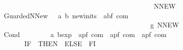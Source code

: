 \begin{isabellebody}
\ \ \ \ \ \ \ \ \ \ \ \ \ \ \ \ \ \ \ \ \ \ \ \ \ \ \ \ \ \ \ \ \ \ \ \ \ \ \ \ \ \ \ \ {\isacharparenleft}{\isachardoublequoteopen}{\isacharparenleft}{\isacharunderscore}\ {\isacharcolon}{\isacharequal}{\isacharequal}{\isacharslash}{\isacharparenleft}{}\ NNEW\ {\isacharunderscore}{\isacharslash}\ {\isacharbrackleft}{\isacharunderscore}{\isacharbrackright}{\isacharparenright}{\isacharparenright}{\isachardoublequoteclose}\ {\isacharbrackleft}{}{}{\isacharcomma}\ {}{}{\isacharcomma}\ {}{\isacharbrackright}\ {}{}{\isacharparenright}\isanewline
\ \ {\isachardoublequoteopen}{\isacharunderscore}GuardedNNew{\isachardoublequoteclose}\ \ {\isacharcolon}{\isacharcolon}\ {\isachardoublequoteopen}{\isacharbrackleft}{\isacharprime}a{\isacharcomma}\ {\isacharprime}b{\isacharcomma}\ newinits{\isacharbrackright}\ {\isasymRightarrow}\ {\isacharparenleft}{\isacharprime}a{\isacharcomma}{\isacharprime}b{\isacharcomma}{\isacharprime}f{\isacharparenright}\ com{\isachardoublequoteclose}\ \isanewline
\ \ \ \ \ \ \ \ \ \ \ \ \ \ \ \ \ \ \ \ \ \ \ \ \ \ \ \ \ \ \ \ \ \ \ \ \ \ \ \ \ \ \ \ {\isacharparenleft}{\isachardoublequoteopen}{\isacharparenleft}{\isacharunderscore}\ {\isacharcolon}{\isacharequal}{\isacharequal}\isactrlsub g{\isacharslash}{\isacharparenleft}{}\ NNEW\ {\isacharunderscore}{\isacharslash}\ {\isacharbrackleft}{\isacharunderscore}{\isacharbrackright}{\isacharparenright}{\isacharparenright}{\isachardoublequoteclose}\ {\isacharbrackleft}{}{}{\isacharcomma}\ {}{}{\isacharcomma}\ {}{\isacharbrackright}\ {}{}{\isacharparenright}\isanewline
\isanewline
\ \ {\isachardoublequoteopen}{\isacharunderscore}Cond{\isachardoublequoteclose}\ \ \ \ \ \ \ \ {\isacharcolon}{\isacharcolon}\ {\isachardoublequoteopen}{\isacharprime}a\ bexp\ {\isacharequal}{\isachargreater}\ {\isacharparenleft}{\isacharprime}a{\isacharcomma}{\isacharprime}p{\isacharcomma}{\isacharprime}f{\isacharparenright}\ com\ {\isacharequal}{\isachargreater}\ {\isacharparenleft}{\isacharprime}a{\isacharcomma}{\isacharprime}p{\isacharcomma}{\isacharprime}f{\isacharparenright}\ com\ {\isacharequal}{\isachargreater}\ {\isacharparenleft}{\isacharprime}a{\isacharcomma}{\isacharprime}p{\isacharcomma}{\isacharprime}f{\isacharparenright}\ com{\isachardoublequoteclose}\isanewline
\ \ \ \ \ \ \ \ {\isacharparenleft}{\isachardoublequoteopen}{\isacharparenleft}{}IF\ {\isacharparenleft}{\isacharunderscore}{\isacharparenright}{\isacharslash}\ {\isacharparenleft}{}THEN{\isacharslash}\ {\isacharunderscore}{\isacharparenright}{\isacharslash}\ {\isacharparenleft}{}ELSE\ {\isacharunderscore}{\isacharparenright}{\isacharslash}\ FI{\isacharparenright}{\isachardoublequoteclose}\ {\isacharbrackleft}{}{\isacharcomma}\ {}{\isacharcomma}\ {}{\isacharbrackright}\ {}{}{\isacharparenright}\isanewline

\end{isabellebody}
